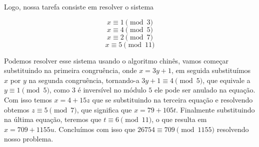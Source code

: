 Logo, nossa tarefa consiste em resolver o sistema

$$x \equiv 1 \pmod{3}$$
$$x \equiv 4 \pmod{5}$$
$$x \equiv 2 \pmod{7}$$
$$x \equiv 5 \pmod{11}$$  

Podemos resolver esse sistema usando o algoritmo chin\^es, vamos come\c{c}ar substituindo na primeira congru\^encia, onde $x = 3y + 1$, em seguida substitu\'imos $x$ por $y$ na segunda congru\^encia, tornando-a $3y + 1 \equiv 4 \pmod{5}$, que equivale a $y \equiv 1 \pmod{5}$, como $3$ \'e invers\'ivel no m\'odulo $5$ ele pode ser anulado na equa\c{c}\~ao. Com isso temos $x = 4+15z$ que se substituindo na terceira equa\c{c}\~ao e resolvendo obtemos $z \equiv 5 \pmod{7}$, que significa que $x = 79 + 105t$. Finalmente substituindo na \'ultima equa\c{c}\~ao, teremos que $t \equiv 6 \pmod{11}$, o que resulta em $x = 709+1155u$. Conclu\'imos com isso que $26754 \equiv 709 \pmod{1155}$ resolvendo nosso problema. 